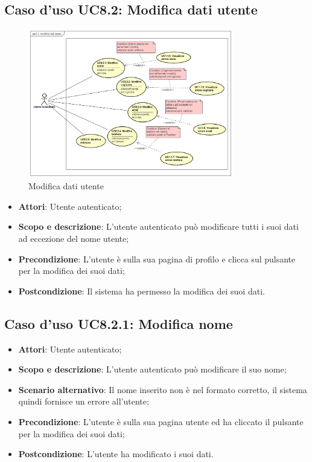 \documentclass[12pt,a4paper,titlepage]{article}
\begin{document}
	\subsection{Caso d'uso UC8.2: Modifica dati utente}
	\label{UC8.2}
	\begin{figure}[H]
		\centering
		\includegraphics[width=0.8\textwidth]{UseCase/ModificaDatiUtente}
		\caption{Modifica dati utente}
	\end{figure}
	\begin{itemize}
		\item \textbf{Attori}: Utente autenticato;
		\item \textbf{Scopo e descrizione}: L'utente autenticato può modificare tutti i suoi dati ad eccezione del nome utente;
		\item \textbf{Precondizione}: L'utente è sulla sua pagina di profilo e clicca sul pulsante per la modifica dei suoi dati;
		\item \textbf{Postcondizione}: Il sistema ha permesso la modifica dei suoi dati.
	\end{itemize}
	\subsection{Caso d'uso UC8.2.1: Modifica nome}
	\label{UC8.2.1}
	\begin{itemize}
		\item \textbf{Attori}: Utente autenticato;
		\item \textbf{Scopo e descrizione}: L'utente autenticato può modificare il suo nome;
		\item \textbf{Scenario alternativo}: Il nome inserito non è nel formato corretto, il sistema quindi fornisce un errore all'utente;
		\item \textbf{Precondizione}: L'utente è sulla sua pagina utente ed ha cliccato il pulsante per la modifica dei suoi dati;
		\item \textbf{Postcondizione}: L'utente ha modificato i suoi dati.
	\end{itemize}
\end{document}
